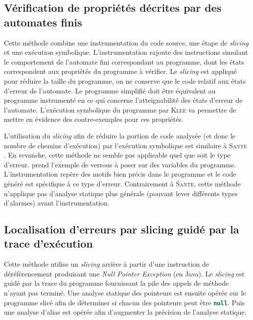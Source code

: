 \documentclass[french]{spimufcphdthesis}
\begin{document}
\subsection{Vérification de propriétés décrites par des automates finis}

Cette méthode \cite{checking-prop-state-machines} combine une instrumentation du
code source, une étape de {\em slicing} et une exécution symbolique.
L'instrumentation rajoute des instructions simulant le comportement de
l'automate fini correspondant au programme, dont les états correspondent aux
propriétés du programme à vérifier.
Le {\em slicing} est appliqué pour réduire la taille du programme, on ne
conserve que le code relatif aux états d'erreur de l'automate. Le programme
simplifié doit être équivalent au programme instrumenté en ce qui concerne
l'atteignabilité des états d'erreur de l'automate.
L'exécution symbolique du programme par \textsc{Klee} \cite{KLEE} va permettre
de mettre en évidence des contre-exemples pour ces propriétés.

L'utilisation du {\em slicing} afin de réduire la portion de code analysée
(et donc le nombre de chemins d'exécution) par l'exécution symbolique est
similaire à \textsc{Sante} \cite{SANTE}. En revanche, cette méthode ne semble
pas applicable quel que soit le type d'erreur.
\cite{checking-prop-state-machines} prend l'exemple de verrous à poser sur des
variables du programme. L'instrumentation repère des motifs bien précis dans le
programme et le code généré est spécifique à ce type d'erreur. Contrairement à
\textsc{Sante}, cette méthode n'applique pas d'analyse statique plus générale
(pouvant lever différents types d'alarmes) avant l'instrumentation.

\subsection{Localisation d'erreurs par slicing guidé par la trace d'exécution}

Cette méthode \cite{fault-localization} utilise un {\em slicing} arrière à
partir d'une instruction de déréférencement produisant une {\em Null Pointer
Exception} (en Java). Le {\em slicing} est guidé par la trace du programme
fournissant la pile des appels de méthode n'ayant pas terminé. Une analyse
statique des pointeurs est ensuite opérée sur le programme slicé afin de
déterminer si chacun des pointeurs peut être \lstinline[language=java]{null}.
Puis une analyse d'alias est opérée afin d'augmenter la précision de l'analyse
statique.
\end{document}
